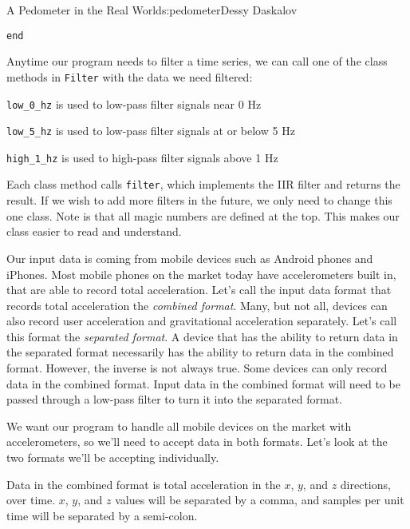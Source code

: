 \begin{aosachapter}{A Pedometer in the Real World}{s:pedometer}{Dessy Daskalov}
\begin{verbatim}
end
\end{verbatim}

Anytime our program needs to filter a time series, we can call one of
the class methods in \texttt{Filter} with the data we need filtered:

\begin{aosaitemize}

\item
  \texttt{low\_0\_hz} is used to low-pass filter signals near 0 Hz
\item
  \texttt{low\_5\_hz} is used to low-pass filter signals at or below 5
  Hz
\item
  \texttt{high\_1\_hz} is used to high-pass filter signals above 1 Hz
\end{aosaitemize}

Each class method calls \texttt{filter}, which implements the IIR filter
and returns the result. If we wish to add more filters in the future, we
only need to change this one class. Note is that all magic numbers are
defined at the top. This makes our class easier to read and understand.

\label{input-formats}

Our input data is coming from mobile devices such as Android phones and
iPhones. Most mobile phones on the market today have accelerometers
built in, that are able to record total acceleration. Let's call the
input data format that records total acceleration the \emph{combined
format}. Many, but not all, devices can also record user acceleration
and gravitational acceleration separately. Let's call this format the
\emph{separated format}. A device that has the ability to return data in
the separated format necessarily has the ability to return data in the
combined format. However, the inverse is not always true. Some devices
can only record data in the combined format. Input data in the combined
format will need to be passed through a low-pass filter to turn it into
the separated format.

We want our program to handle all mobile devices on the market with
accelerometers, so we'll need to accept data in both formats. Let's look
at the two formats we'll be accepting individually.

\label{combined-format}

Data in the combined format is total acceleration in the $x$, $y$, and
$z$ directions, over time. $x$, $y$, and $z$ values will be separated by
a comma, and samples per unit time will be separated by a semi-colon.


\end{aosachapter}
